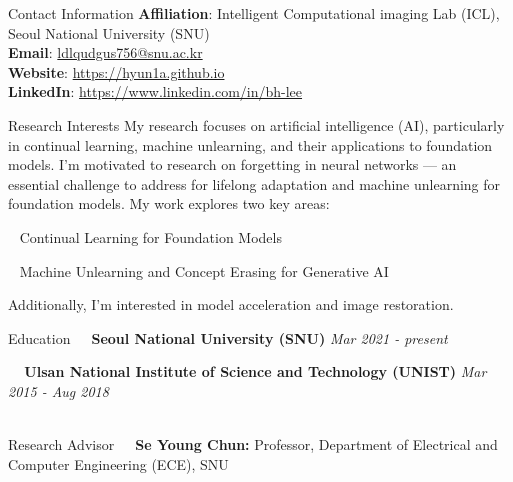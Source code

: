 \documentclass{resume} %
\begin{document}
\begin{rSection}{Contact Information}
{\bf Affiliation}: Intelligent Computational imaging Lab (ICL), Seoul National University (SNU) \\
{\bf Email}: \href{mailto:ldlqudgus756@snu.ac.kr}{ldlqudgus756@snu.ac.kr} \\
{\bf Website}: \href{https://hyun1a.github.io}{https://hyun1a.github.io} \\
{\bf LinkedIn}: \href{https://www.linkedin.com/in/bh-lee}{https://www.linkedin.com/in/bh-lee} \\
\end{rSection}


\begin{rSection}{Research Interests}
My research focuses on artificial intelligence (AI), particularly in continual learning, machine unlearning, and their applications to foundation models. I’m motivated to research on forgetting in neural networks — an essential challenge to address for lifelong adaptation and machine unlearning for foundation models. My work explores two key areas:

\textbullet~\,\,Continual Learning for Foundation Models

\textbullet~\,\,Machine Unlearning and Concept Erasing for Generative AI


Additionally, I’m interested in model acceleration and image restoration. \\
\end{rSection}




\begin{rSection}{Education}
\textbullet~\,\, {\bf Seoul National University (SNU)} \hfill {\it Mar 2021 - present}
\\\hspace*{1.5em}{Combined M.S./Ph.D Program in Electrical and Computer Engineering (ECE)} 

\textbullet~\,\, {\bf Ulsan National Institute of Science and Technology (UNIST)} \hfill {\it Mar 2015 - Aug 2018}
\\\hspace*{1.5em}{B.S. in Electical Engineering, GPA: 4.04/4.30}\\

\end{rSection}
\begin{rSection}{Research Advisor}
\textbullet~\,\,\,\,{\bf Se Young Chun:}{ Professor, Department of Electrical and Computer Engineering (ECE), SNU} \\
\end{rSection}
\end{document}
